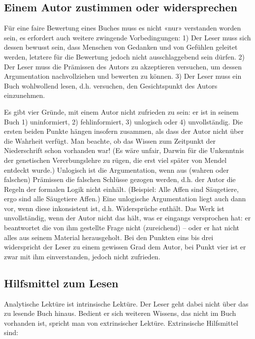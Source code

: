 \documentclass[a4paper,11pt]{scrartcl}
\begin{document}
\subsection{Einem Autor zustimmen oder widersprechen}

Für eine faire Bewertung eines Buches muss es nicht «nur» verstanden worden sein, es erfordert auch weitere zwingende Vorbedingungen: 1) Der Leser muss sich dessen bewusst sein, dass Menschen von Gedanken und von Gefühlen geleitet werden, letztere für die Bewertung jedoch nicht ausschlaggebend sein dürfen. 2) Der Leser muss die Prämissen des Autors zu akzeptieren versuchen, um dessen Argumentation nachvollziehen und bewerten zu können. 3) Der Leser muss ein Buch wohlwollend lesen, d.h. versuchen, den Gesichtspunkt des Autors einzunehmen.

Es gibt vier Gründe, mit einem Autor nicht zufrieden zu sein: er ist in seinem Buch 1) uninformiert, 2) fehlinformiert, 3) unlogisch oder 4) unvollständig. Die ersten beiden Punkte hängen insofern zusammen, als dass der Autor nicht über die Wahrheit verfügt. Man beachte, ob das Wissen zum Zeitpunkt der Niederschrift schon vorhanden war! (Es wäre unfair, Darwin für die Unkenntnis der genetischen Vererbungslehre zu rügen, die erst viel später von Mendel entdeckt wurde.) Unlogisch ist die Argumentation, wenn aus (wahren oder falschen) Prämissen die falschen Schlüsse gezogen werden, d.h. der Autor die Regeln der formalen Logik nicht einhält. (Beispiel: Alle Affen sind Säugetiere, ergo sind alle Säugetiere Affen.) Eine unlogische Argumentation liegt auch dann vor, wenn diese inkonsistent ist, d.h. Widersprüche enthält. Das Werk ist unvollständig, wenn der Autor nicht das hält, was er eingangs versprochen hat: er beantwortet die von ihm gestellte Frage nicht (zureichend) – oder er hat nicht alles aus seinem Material herausgeholt. Bei den Punkten eins bis drei widerspricht der Leser zu einem gewissen Grad dem Autor, bei Punkt vier ist er zwar mit ihm einverstanden, jedoch nicht zufrieden.

\subsection{Hilfsmittel zum Lesen}

Analytische Lektüre ist intrinsische Lektüre. Der Leser geht dabei nicht über das zu lesende Buch hinaus. Bedient er sich weiteren Wissens, das nicht im Buch vorhanden ist, spricht man von extrinsischer Lektüre. Extrinsische Hilfsmittel sind:
\end{document}
